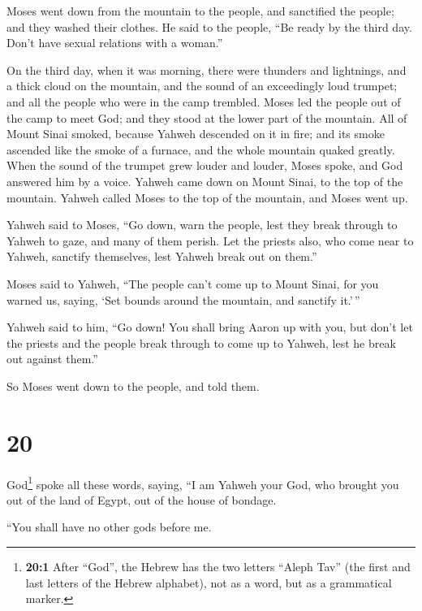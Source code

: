  Moses went down from the mountain to the people, and
sanctified the people; and they washed their clothes.  He
said to the people, ``Be ready by the third day. Don't have sexual
relations with a woman.''

 On the third day, when it was morning, there were
thunders and lightnings, and a thick cloud on the mountain, and the
sound of an exceedingly loud trumpet; and all the people who were in the
camp trembled.  Moses led the people out of the camp to
meet God; and they stood at the lower part of the mountain.
 All of Mount Sinai smoked, because Yahweh descended on
it in fire; and its smoke ascended like the smoke of a furnace, and the
whole mountain quaked greatly.  When the sound of the
trumpet grew louder and louder, Moses spoke, and God answered him by a
voice.  Yahweh came down on Mount Sinai, to the top of
the mountain. Yahweh called Moses to the top of the mountain, and Moses
went up.

 Yahweh said to Moses, ``Go down, warn the people, lest
they break through to Yahweh to gaze, and many of them perish.
 Let the priests also, who come near to Yahweh, sanctify
themselves, lest Yahweh break out on them.''

 Moses said to Yahweh, ``The people can't come up to
Mount Sinai, for you warned us, saying, `Set bounds around the mountain,
and sanctify it.'\,''

 Yahweh said to him, ``Go down! You shall bring Aaron up
with you, but don't let the priests and the people break through to come
up to Yahweh, lest he break out against them.''

 So Moses went down to the people, and told them.

\hypertarget{section-19}{%
\section{20}\label{section-19}}

 God\footnote{\textbf{20:1} After ``God'', the Hebrew has
  the two letters ``Aleph Tav'' (the first and last letters of the
  Hebrew alphabet), not as a word, but as a grammatical marker.} spoke
all these words, saying,  ``I am Yahweh your God, who
brought you out of the land of Egypt, out of the house of bondage.

 ``You shall have no other gods before me.

